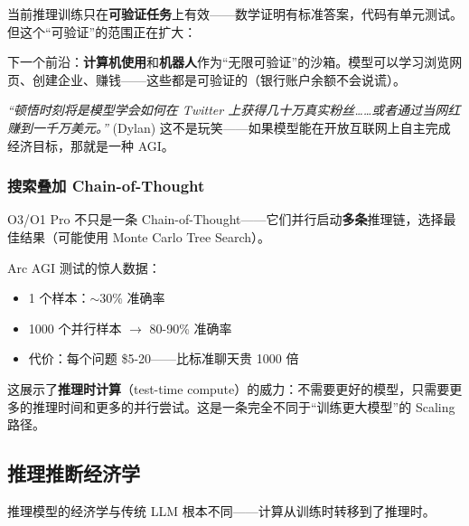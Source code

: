 \documentclass[a4paper]{article}
\begin{document}
当前推理训练只在\textbf{可验证任务}上有效——数学证明有标准答案，代码有单元测试。但这个``可验证''的范围正在扩大：

下一个前沿：\textbf{计算机使用}和\textbf{机器人}作为``无限可验证''的沙箱。模型可以学习浏览网页、创建企业、赚钱——这些都是可验证的（银行账户余额不会说谎）。

\textit{``顿悟时刻将是模型学会如何在 Twitter 上获得几十万真实粉丝……或者通过当网红赚到一千万美元。''} (Dylan) 这不是玩笑——如果模型能在开放互联网上自主完成经济目标，那就是一种 AGI。

\subsubsection{搜索叠加 Chain-of-Thought}

O3/O1 Pro 不只是一条 Chain-of-Thought——它们并行启动\textbf{多条}推理链，选择最佳结果（可能使用 Monte Carlo Tree Search）。

Arc AGI 测试的惊人数据：
\begin{itemize}
    \item 1 个样本：$\sim$30\% 准确率
    \item 1000 个并行样本 $\to$ 80-90\% 准确率
    \item 代价：每个问题 \$5-20——比标准聊天贵 1000 倍
\end{itemize}

这展示了\textbf{推理时计算}（test-time compute）的威力：不需要更好的模型，只需要更多的推理时间和更多的并行尝试。这是一条完全不同于``训练更大模型''的 Scaling 路径。

\subsection{推理推断经济学}

推理模型的经济学与传统 LLM 根本不同——计算从训练时转移到了推理时。
\end{document}
